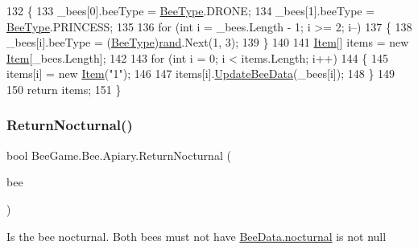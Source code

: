 \begin{DoxyCode}
132         \{
133             \_bees[0].beeType = \hyperlink{namespace_bee_game_1_1_enums_a9376a1582db99d20c756e24de728944f}{BeeType}.DRONE;
134             \_bees[1].beeType = \hyperlink{namespace_bee_game_1_1_enums_a9376a1582db99d20c756e24de728944f}{BeeType}.PRINCESS;
135 
136             \textcolor{keywordflow}{for} (\textcolor{keywordtype}{int} i = \_bees.Length - 1; i >= 2; i--)
137             \{
138                 \_bees[i].beeType = (\hyperlink{namespace_bee_game_1_1_enums_a9376a1582db99d20c756e24de728944f}{BeeType})\hyperlink{class_bee_game_1_1_bee_1_1_apiary_a272ac8b385ad3a7cd358b0959d561be7}{rand}.Next(1, 3);
139             \}
140 
141             \hyperlink{struct_bee_game_1_1_items_1_1_item}{Item}[] items = \textcolor{keyword}{new} \hyperlink{struct_bee_game_1_1_items_1_1_item}{Item}[\_bees.Length];
142 
143             \textcolor{keywordflow}{for} (\textcolor{keywordtype}{int} i = 0; i < items.Length; i++)
144             \{
145                 items[i] = \textcolor{keyword}{new} \hyperlink{struct_bee_game_1_1_items_1_1_item}{Item}(\textcolor{stringliteral}{"1"});
146 
147                 items[i].\hyperlink{struct_bee_game_1_1_items_1_1_item_a4bc320f90a3fb06467046eedeb88ed13}{UpdateBeeData}(\_bees[i]);
148             \}
149 
150             \textcolor{keywordflow}{return} items;
151         \}
\end{DoxyCode}
\mbox{\label{class_bee_game_1_1_bee_1_1_apiary_a88c438661490f5f8c0213353be1d5cac}} 
\subsubsection{\texorpdfstring{Return\+Nocturnal()}{ReturnNocturnal()}}
{\footnotesize\ttfamily bool Bee\+Game.\+Bee.\+Apiary.\+Return\+Nocturnal (\begin{DoxyParamCaption}\item[{\hyperlink{struct_bee_game_1_1_bee_1_1_bee_data}{Bee\+Data}}]{bee }\end{DoxyParamCaption})\hspace{0.3cm}{\ttfamily [private]}}



Is the bee nocturnal. Both bees must not have \hyperlink{struct_bee_game_1_1_bee_1_1_bee_data_a4cd90eee8d255726d982116f14b444b2}{Bee\+Data.\+nocturnal} is not null 


